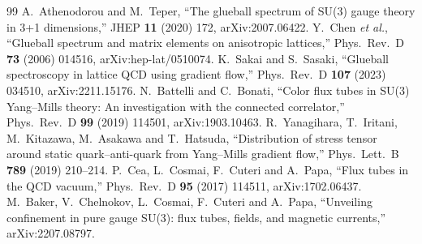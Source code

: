 \documentclass[11pt,a4paper]{article}
\theoremstyle{definition}
\theoremstyle{remark}
\begin{document}
\begin{thebibliography}{99}\small
{} A.~Athenodorou and M.~Teper, ``The glueball spectrum of SU(3) gauge theory in 3+1 dimensions,'' JHEP \textbf{11} (2020) 172, arXiv:2007.06422.
 Y.~Chen \emph{et al.}, ``Glueball spectrum and matrix elements on anisotropic lattices,'' Phys.\ Rev.\ D \textbf{73} (2006) 014516, arXiv:hep-lat/0510074.
 K.~Sakai and S.~Sasaki, ``Glueball spectroscopy in lattice QCD using gradient flow,'' Phys.\ Rev.\ D \textbf{107} (2023) 034510, arXiv:2211.15176.
 N.~Battelli and C.~Bonati, ``Color flux tubes in SU(3) Yang--Mills theory: An investigation with the connected correlator,'' Phys.\ Rev.\ D \textbf{99} (2019) 114501, arXiv:1903.10463.
 R.~Yanagihara, T.~Iritani, M.~Kitazawa, M.~Asakawa and T.~Hatsuda, ``Distribution of stress tensor around static quark--anti-quark from Yang--Mills gradient flow,'' Phys.\ Lett.\ B \textbf{789} (2019) 210--214.
 P.~Cea, L.~Cosmai, F.~Cuteri and A.~Papa, ``Flux tubes in the QCD vacuum,'' Phys.\ Rev.\ D \textbf{95} (2017) 114511, arXiv:1702.06437.
 M.~Baker, V.~Chelnokov, L.~Cosmai, F.~Cuteri and A.~Papa, ``Unveiling confinement in pure gauge SU(3): flux tubes, fields, and magnetic currents,'' arXiv:2207.08797.
\end{thebibliography}
\end{document}
